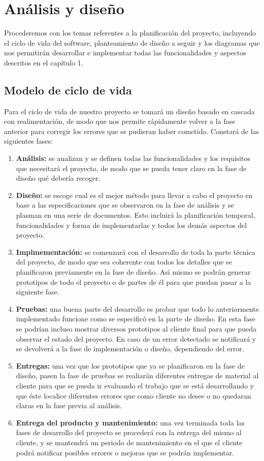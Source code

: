 \documentclass[palatino]{apuntes}
\begin{document}
\chapter{Análisis y diseño}
Procederemos con los temas referentes a la planificación del proyecto, incluyendo el ciclo de vida del software, planteamiento de diseño a seguir y los diagramas que nos permitirán desarrollar e implementar todas las funcionalidades y aspectos descritos en el capítulo 1.

\section{Modelo de ciclo de vida}

Para el ciclo de vida de nuestro proyecto se tomará un diseño basado en cascada con realimentación, de modo que nos permite rápidamente volver a la fase anterior para corregir los errores que se pudieran haber cometido. Constará de las siguientes fases:

\begin{enumerate}
	\item \textbf{Análisis:} se analizan y se definen todas las funcionalidades y los requisitos que necesitará el proyecto, de modo que se pueda tener claro en la fase de diseño qué debería recoger.
	\item \textbf{Diseño:} se escoge cual es el mejor método para llevar a cabo el proyecto en base a las especificaciones que se observaron en la fase de análisis y se plasman en una serie de documentos. Esto incluirá  la planificación temporal, funcionalidades y forma de implementarlas y todos los demás aspectos del proyecto.
	\item \textbf{Implmementación:} se comenzará con el desarrollo de toda la parte técnica del proyecto, de modo que sea coherente con todos los detalles que se planificaron previamente en la fase de diseño. Así mismo se podrán generar prototipos de todo el proyecto o de partes de él para que puedan pasar a la siguiente fase.
	\item \textbf{Pruebas:} una buena parte del desarrollo es probar que todo lo anteriormente implementado funcione como se especificó en la parte de diseño. En esta fase se podrían incluso mostrar diversos prototipos al cliente final para que pueda observar el estado del proyecto. En caso de un error detectado se notificará y se devolverá a la fase de implementación o diseño, dependiendo del error.
	\item \textbf{Entregas:} una vez que los prototipos que ya se planificaron en la fase de diseño, pasen la fase de pruebas se realiarán diferentes entregas de material al cliente para que se pueda ir evaluando el trabajo que se está desarrollando y que éste localice diferentes errores que como cliente no desee o no quedaran claras en la fase previa al análisis.
	\item \textbf{Entrega del producto y mantenimiento:} una vez terminada toda las fases de desarrollo del proyecto se procederá con la entrega del mismo al cliente, y se mantendrá un periodo de mantenimiento en el que el cliente podrá notificar posibles errores o mejoras que se podrán implementar.
\end{enumerate}
\end{document}
